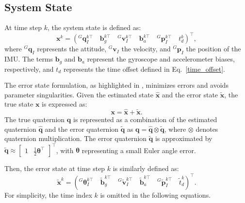 \subsection{System State}
\label{sec: system state}
At time step \( k \), the system state is defined as:
\begin{equation}
    \mathbf{x}^k = 
    \left(
    {}^G\mathbf{q}_I^{k\top} \quad 
    \mathbf{b}_g^{k\top} \quad 
    {}^G\mathbf{v}_I^{k\top} \quad 
    \mathbf{b}_a^{k\top} \quad
    {}^G\mathbf{p}_I^{k\top} \quad
    {t}_d^k
    \right)^\top,
\end{equation}
where ${}^G\mathbf{q}_I$ represents the attitude, ${}^G\mathbf{v}_I$ the velocity, and ${}^G\mathbf{p}_I$ the position of the IMU. The terms $\mathbf{b}_g$ and $\mathbf{b}_a$ represent the gyroscope and accelerometer biases, respectively, and ${t}_d$ represents the time offset defined in Eq.~\eqref{time_offset}.

The error state formulation, as highlighted in \cite{sola2017quaternion}, minimizes errors and avoids parameter singularities. Given the estimated state $\hat{\mathbf{x}}$ and the error state $\tilde{\mathbf{x}}$, the true state $\mathbf{x}$ is expressed as:
\begin{equation}
    \mathbf{x} = \hat{\mathbf{x}} + \tilde{\mathbf{x}}.
\end{equation}
The true quaternion $\mathbf{q}$ is represented as a combination of the estimated quaternion $\hat{\mathbf{q}}$ and the error quaternion $\tilde{\mathbf{q}}$ as $\mathbf{q} = \hat{\mathbf{q}} \otimes \tilde{\mathbf{q}}$, where $\otimes$ denotes quaternion multiplication. The error quaternion $\tilde{\mathbf{q}}$ is approximated by $\tilde{\mathbf{q}} \approx \begin{bmatrix} 1 & \frac{1}{2} \boldsymbol{\theta}^\top \end{bmatrix}^\top$, with $\boldsymbol{\theta}$ representing a small Euler angle error.

Then, the error state at time step $k$ is similarly defined as:
\begin{equation}
    \tilde{\mathbf{x}}^k = 
    \left(
    {}^G\bm{\theta}_I^{k\top} \quad 
    \tilde{\mathbf{b}}_g^{k\top} \quad 
    {}^G\tilde{\mathbf{v}}_I^{k\top} \quad 
    \tilde{\mathbf{b}}_a^{k\top} \quad
    {}^G\tilde{\mathbf{p}}_I^{k\top} \quad
    \tilde{t}_d^k
    \right)^\top.
\end{equation}
For simplicity, the time index \(k\) is omitted in the following equations.